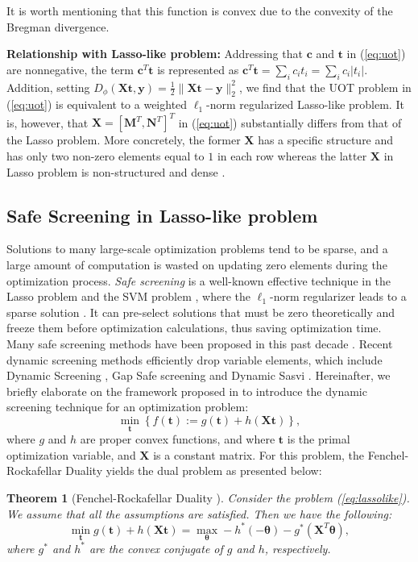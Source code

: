 \documentclass[twoside]{article}
\theoremstyle{plain}
\newtheorem{thm}{Theorem}
\newcommand{\mat}[1]{\mathbf{#1}}
\renewcommand{\vec}[1]{\bm{#1}}
\begin{document}
It is worth mentioning that this function is convex due to the convexity of the Bregman divergence.

{\bf Relationship with Lasso-like problem:} 
Addressing that $\vec{c}$ and $\vec{t}$ in (\ref{eq:uot}) are nonnegative, the term $\vec{c}^T\vec{t}$ is represented as $\vec{c}^T\vec{t}=\sum_i c_i t_i = \sum_ic_i |t_i|$. Addition,  setting $D_\phi(\mat{X} \vec{t},\vec{y}) = \frac{1}{2}\|\mat{X} \vec{t}-\vec{y}\|_2^2$, we find that the UOT problem in (\ref{eq:uot}) is equivalent to a weighted $\ell_1$-norm regularized Lasso-like problem. It is, however, that $\mat{X} = [\mat{M}^T,\mat{N}^T]^T$ in (\ref{eq:uot}) substantially differs from that of the Lasso problem. More concretely, the former $\mat{X}$ has a specific structure and has only two non-zero elements equal to $1$ in each row whereas the latter $\mat{X}$ in Lasso problem is non-structured and dense \citep{Chapel_NeurIPS_2021}.

\subsection{Safe Screening in Lasso-like problem}
Solutions to many large-scale optimization problems tend to be sparse, and a large amount of computation is wasted on updating zero elements during the optimization process. {\it Safe screening} is a well-known effective technique in the Lasso problem and the SVM problem \citep{Ogawa_ICML_2013}, where the $\ell_1$-norm regularizer leads to a sparse solution \citep{ghaoui2010safe}. It can pre-select solutions that must be zero theoretically and freeze them before optimization calculations, thus saving optimization time. Many safe screening methods have been proposed in this past decade \citep{Liu_ICML_2014,Wang_JMLR_2015}. Recent dynamic screening methods efficiently drop variable elements, which include Dynamic Screening \citep{7128732}, Gap Safe screening \citep{JMLR:v18:16-577} and Dynamic Sasvi \citep{Yamada_NIPS_2021}.
%
Hereinafter, we briefly elaborate on the framework proposed in \citep{Yamada_NIPS_2021} to introduce the dynamic screening technique for an optimization problem:
\begin{equation}
\label{eq:lassolike}
\min_{\vec{t}} \left\{ f(\vec{t}) := g(\vec{t}) + h(\mat{X} \vec{t}) \right\},
\end{equation}
where $g$ and $h$ are proper convex functions, and where $\vec{t}$ is the primal optimization variable, and $\mat{X}$ is a constant matrix. For this problem, the Fenchel-Rockafellar Duality yields the dual problem as presented below:
%
\begin{thm}[Fenchel-Rockafellar Duality {\citep{Rockafellar_Springer_1998}}]
\label{Thm:FRD} 
Consider the problem (\ref{eq:lassolike}). We assume that all the assumptions are satisfied. Then we have the following:
\begin{equation}
\label{Eq:FRD}
\min_{\vec{t}} g(\vec{t}) + h(\mat{X}\vec{t}) = \max_{\vec{\vec{\theta}}} -h^*(-\vec{\theta})-g^*(\mat{X}^T\vec{\theta}),
\end{equation}
where $g^*$ and $h^*$ are the convex conjugate of $g$ and $h$, respectively.
\end{thm}
\end{document}
